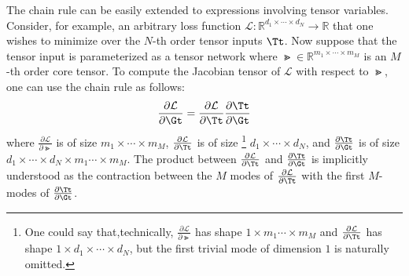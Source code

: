 The chain rule can be easily extended to expressions involving tensor variables. Consider, for example, an arbitrary loss function $\mathcal{ L}: \mathbb{R}^{d_1\times \cdots \times d_N} \to \mathbb{R}$ that one wishes to minimize over the $N$-th order tensor inputs $\Tt$. Now suppose that the tensor input is parameterized as a tensor network where $\Gt \in \mathbb{R}^{m_1\times \cdots \times m_M}$ is an $M$-th order core tensor. To compute the Jacobian tensor of $\mathcal L$ with respect to $\Gt$, one can use the chain rule as follows: 
$$\frac{\partial  \mathcal L}{\partial\Gt} 
=
\frac{\partial \mathcal L}{\partial \Tt }\frac{\partial\Tt}{\partial\Gt}  $$
where $\frac{\partial  \mathcal L}{\partial\Gt}$ is of size $m_1\times\cdots \times m_M$, $\frac{\partial  \mathcal L}{\partial \Tt }$ is of size%
\footnote{One could say that,technically, $\frac{\partial  \mathcal L}{\partial\Gt}$ has shape $1\times m_1 \cdots \times m_M$  and $\frac{\partial  \mathcal L}{\partial \Tt }$ has shape $1\times d_1\times \cdots \times d_N$, but the first trivial mode of dimension $1$ is naturally omitted.}
$d_1\times \cdots \times d_N$, and $\frac{\partial\Tt}{\partial\Gt} $ is of size $d_1\times \cdots \times d_N \times m_1 \cdots \times m_M$. The product between $\frac{\partial  \mathcal L}{\partial \Tt }$ and $\frac{\partial\Tt}{\partial\Gt}  $ is implicitly understood as the contraction between the $M$ modes of $\frac{\partial  \mathcal L}{\partial \Tt }$ with the first $M$-modes  of $\frac{\partial\Tt}{\partial\Gt}  $.

